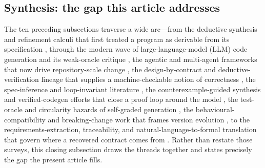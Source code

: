 \subsection{Synthesis: the gap this article addresses}
\label{subsec:rw-gap}

The ten preceding subsections traverse a wide arc---from the deductive synthesis and refinement calculi that first treated a program as derivable from its specification \cite{manna1980deductive,back1998refinement,morgan1994programming}, through the modern wave of large-language-model (LLM) code generation and its weak-oracle critique \cite{chen2021codex,liu2023evalplus,zhang2025hallucination}, the agentic and multi-agent frameworks that now drive repository-scale change \cite{yang2024sweagent,hong2024metagpt,liu2024llmagentse}, the design-by-contract and deductive-verification lineage that supplies a machine-checkable notion of correctness \cite{meyer1992dbc,leavens2006jml,cok2014openjml}, the spec-inference and loop-invariant literature \cite{ernst2007daikon,flanagan2001houdini,kamath2023loopy}, the counterexample-guided synthesis and verified-codegen efforts that close a proof loop around the model \cite{solarlezama2008sketching,sun2024clover,misu2024dafny}, the test-oracle and circularity hazards of self-graded generation \cite{barr2015oracle,liu2026oracle}, the behavioural-compatibility and breaking-change work that frames version evolution \cite{mostafa2017behavioral,jayasuriya2024understanding,foo2018efficient}, to the requirements-extraction, traceability, and natural-language-to-formal translation that govern where a recovered contract comes from \cite{antoniol2002recovering,merten2015issuetracking,endres2024nl2postcond}. Rather than restate those surveys, this closing subsection draws the threads together and states precisely the gap the present article fills.

